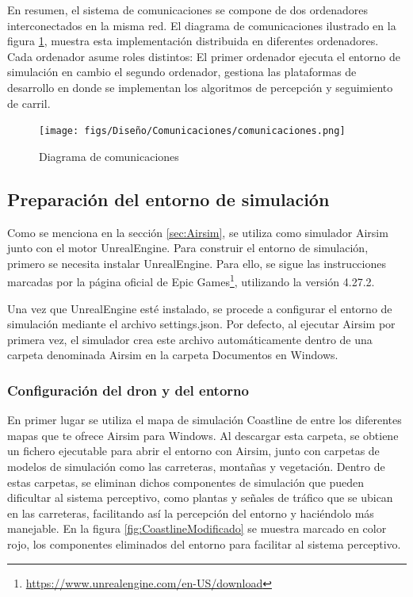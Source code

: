 En resumen, el sistema de comunicaciones se compone de dos ordenadores interconectados en la misma red. El diagrama 
de comunicaciones ilustrado en la figura \ref{fig:diagramadeAirsim}, muestra esta implementación distribuida en diferentes ordenadores. Cada ordenador asume roles distintos: 
El primer ordenador ejecuta el entorno de simulación en cambio el segundo ordenador, gestiona las plataformas de desarrollo en donde se implementan los algoritmos 
de percepción y seguimiento de carril. 

\begin{figure} [H]
  \begin{center}
    \texttt{[image: figs/Diseño/Comunicaciones/comunicaciones.png]}
  \end{center}
  \caption{Diagrama de comunicaciones}
  \label{fig:diagramadeAirsim}
\end{figure}

\subsection{Preparación del entorno de simulación}
\label{sec:Preparación_entorno}

Como se menciona en la sección \ref{sec:Airsim}, se utiliza como simulador Airsim junto con el motor UnrealEngine. Para construir el entorno de simulación, primero
se necesita instalar UnrealEngine. Para ello, se sigue las instrucciones marcadas por la página oficial de Epic Games\footnote{\url{https://www.unrealengine.com/en-US/download}}, 
utilizando la versión 4.27.2.

Una vez que UnrealEngine esté instalado, se procede a configurar el entorno de simulación mediante el archivo settings.json. Por defecto, al ejecutar Airsim 
por primera vez, el simulador crea este archivo automáticamente dentro de una carpeta denominada Airsim en la carpeta Documentos en Windows. 


\subsubsection{Configuración del dron y del entorno}
\label{subsec:Configuración del dron y del entorno}
En primer lugar se utiliza el mapa de simulación Coastline de entre los diferentes mapas que te ofrece Airsim para Windows. Al descargar esta carpeta, 
se obtiene un fichero ejecutable para abrir el entorno con Airsim, junto con carpetas de modelos de simulación como las carreteras, montañas y vegetación. Dentro de estas carpetas, se eliminan dichos componentes 
de simulación que pueden dificultar al sistema perceptivo, como plantas y señales de tráfico que se ubican en las carreteras, facilitando así la percepción del entorno 
y haciéndolo más manejable. En la figura \ref{fig:CoastlineModificado} se muestra marcado en color rojo, los componentes eliminados del entorno para facilitar al sistema 
perceptivo.

